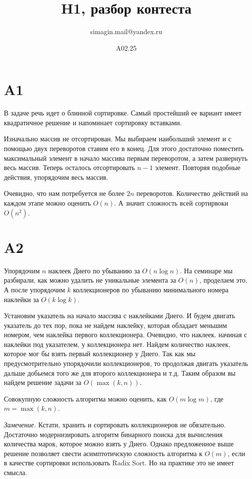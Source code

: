 \documentclass[10pt, oneside, notitlepage]{article}
\title{H1, разбор контеста}
\author{simagin.mail@yandex.ru}
\date{A02.25}
\newenvironment{remark}
    {\textit{Замечение.}}
    {\par}
\begin{document}
\maketitle

\section*{A1}
    В задаче речь идет о блинной сортировке.
    Самый простейший ее вариант имеет квадратичное решение и напоминает сортировку вставками.

    Изначально массив не отсортирован.
    Мы выбираем наибольший элемент и с помощью двух переворотов ставим его в конец.
    Для этого достаточно поместить максимальный элемент в начало массива первым переворотом,
    а затем развернуть весь массив.
    Теперь осталось отсортировать $n - 1$ элемент.
    Повторяя подобные действия, упорядочим весь массив.

    Очевидно, что нам потребуется не более $2n$ переворотов.
    Количество действий на каждом этапе можно оценить $O(n)$.
    А значит сложность всей сортирвоки $O(n^2)$.

\section*{A2}
    Упорядочим $n$ наклеек Диего по убыванию за $O(n \log n)$.
    На семинаре мы разбирали, как можно удалить не уникальные элемента за $O(n)$, проделаем это.
    А после упорядочим $k$ коллекционеров по убыванию минимального номера наклейки за $O(k \log k)$.

    Установим указатель на начало массива с наклейками Диего.
    И будем двигать указатель до тех пор, пока не найдем наклейку, которая обладает меньшим номером,
    чем наклейка первого коллекционера.
    Очевидно, что наклеек. начиная с наклейки под указателем, у коллекционера нет.
    Найдем количество наклеек, которое мог бы взять первый коллекционер у Диего.
    Так как мы предусмотрительно упорядочили коллекционеров,
    то продолжая двигать указатель дальше добьемся того же для второго коллекционера и т.д.
    Таким образом вы найдем решение задачи за  $O(\max(k, n))$.

    Совокупную сложность алгоритма можно оценить,
    как $O(m \log m)$, где $m = \max(k, n)$.

    \begin{remark}
        Кстати, хранить и сортировать коллекционеров не обязательно.
        Достаточно модернизировать алгоритм бинарного поиска для вычисления количества
        марок, которое можно взять у Диего.
        Однако предложенное выше решение позволяет свести асимптотичскую сложность алгоритма
        к $O(m)$, если в качестве сортировки использовать Radix Sort.
        Но на практике это не имеет смысла.
    \end{remark}
\end{document}
